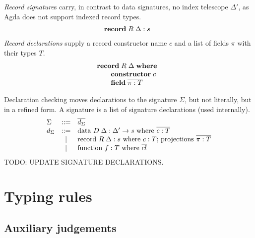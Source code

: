 \documentclass[acmlarge,fleqn]{acmart}\settopmatter{}
\begin{document}
\emph{Record signature}s carry, in contrast to data signatures,
no index telescope $\Delta'$, as Agda does not support indexed record types.
\[
\begin{array}{@{}l}
\textbf{record}\; R\; \Delta : s
\end{array}
\]
\emph{Record declarations} supply a record constructor name $c$
and a list of fields $\pi$ with their types $T$.
\[
\begin{array}{@{}l}
\textbf{record}\; R\; \Delta \; \textbf{where} \\
\qquad  \textbf{constructor}\; c \\
\qquad  \textbf{field}\; \overline{\pi : T} \\
\end{array}
\]

Declaration checking moves declarations to the signature $\Sigma$,
but not literally, but in a refined form.
A signature is a list of signature declarations (used internally).
\[
\begin{array}{lcl}
\Sigma & ::= &  \overline{d_\Sigma} \\
d_\Sigma & ::= & \text{data } D\; \Delta : \Delta' \to s \text{ where } \overline{c : T} \\
& \mid & \text{record } R\;\Delta : s \text{ where $c : T$; } \text{projections } \overline{\pi : T} \\
& \mid & \text{function } f : T \text{ where } \overline{cl}
\end{array}
\]
TODO: UPDATE SIGNATURE DECLARATIONS.




\section{Typing rules}
\label{sec:typing}


\subsection{Auxiliary judgements}
\end{document}
